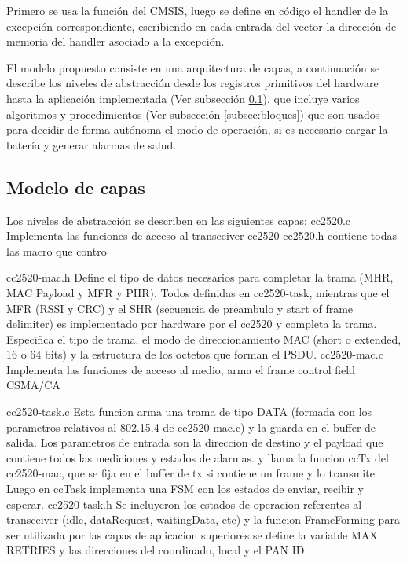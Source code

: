 {Primero se usa la función del CMSIS, luego se define en código el handler de la excepción correspondiente, escribiendo en cada entrada del vector la dirección de memoria del handler asociado a la excepción.

El modelo propuesto consiste en una arquitectura de capas, a continuación se describe los niveles de abstracción desde los registros primitivos del hardware hasta la aplicación implementada (Ver subsección \ref{subsec:capas}), que incluye varios algoritmos y procedimientos (Ver subsección \ref{subsec:bloques}) que son usados para decidir de forma autónoma el modo de operación, si es necesario cargar la batería y generar alarmas de salud.

\subsection{Modelo de capas}
\label{subsec:capas} 
Los niveles de abstracción se describen en las siguientes capas:
cc2520.c
Implementa las funciones de acceso al transceiver cc2520
cc2520.h
contiene todas las macro que contro 

cc2520-mac.h
Define el tipo de datos necesarios para completar la trama (MHR, MAC Payload y MFR y PHR). Todos definidas en cc2520-task, mientras que el MFR (RSSI y CRC) y el SHR (secuencia de preambulo y start of frame delimiter) es implementado por hardware por el cc2520 y completa la trama. 
Especifica el tipo de trama, el modo de direccionamiento MAC (short o extended, 16 o 64 bits) y la estructura de los octetos que forman el PSDU.
cc2520-mac.c
Implementa las funciones de acceso al medio, arma el frame control field
CSMA/CA

cc2520-task.c
Esta funcion arma una trama de tipo DATA (formada con los parametros relativos al 802.15.4 de cc2520-mac.c) y la guarda en el buffer de salida. Los parametros de entrada son la direccion de destino y el payload que contiene todos las mediciones y estados de alarmas. 
y llama la funcion ccTx del cc2520-mac, que se fija en el buffer de tx si contiene un frame y lo transmite
Luego en ccTask implementa una FSM con los estados de enviar, recibir y esperar.
cc2520-task.h
Se incluyeron los estados de operacion referentes al transceiver (idle, dataRequest, waitingData, etc)
y la funcion FrameForming para ser utilizada por las capas de aplicacion superiores
se define la variable MAX RETRIES y las direcciones del coordinado, local y el PAN ID


}
